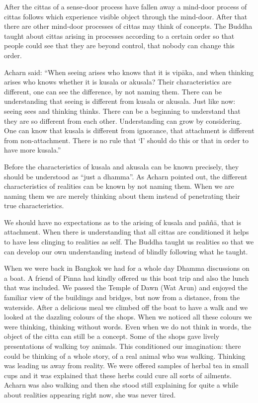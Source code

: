 After the cittas of a sense-door process have fallen away a mind-door
process of cittas follows which experience visible object through the
mind-door. After that there are other mind-door processes of cittas may
think of concepts. The Buddha taught about cittas arising in processes
according to a certain order so that people could see that they are
beyond control, that nobody can change this order.

Acharn said: ``When seeing arises who knows that it is vipāka, and when
thinking arises who knows whether it is kusala or akusala? Their
characteristics are different, one can see the difference, by not naming
them. There can be understanding that seeing is different from kusala or
akusala. Just like now: seeing sees and thinking thinks. There can be a
beginning to understand that they are so different from each other.
Understanding can grow by considering. One can know that kusala is
different from ignorance, that attachment is different from
non-attachment. There is no rule that `I' should do this or that in
order to have more kusala.''

Before the characteristics of kusala and akusala can be known precisely,
they should be understood as ``just a dhamma''. As Acharn pointed out,
the different characteristics of realities can be known by not naming
them. When we are naming them we are merely thinking about them instead
of penetrating their true characteristics.

We should have no expectations as to the arising of kusala and paññā,
that is attachment. When there is understanding that all cittas are
conditioned it helps to have less clinging to realities as self. The
Buddha taught us realities so that we can develop our own understanding
instead of blindly following what he taught.

When we were back in Bangkok we had for a whole day Dhamma discussions
on a boat. A friend of Pinna had kindly offered us this boat trip and
also the lunch that was included. We passed the Temple of Dawn (Wat
Arun) and enjoyed the familiar view of the buildings and bridges, but
now from a distance, from the waterside. After a delicious meal we
climbed off the boat to have a walk and we looked at the dazzling
colours of the shops. When we noticed all these colours we were
thinking, thinking without words. Even when we do not think in words,
the object of the citta can still be a concept. Some of the shops gave
lively presentations of walking toy animals. This conditioned our
imagination: there could be thinking of a whole story, of a real animal
who was walking. Thinking was leading us away from reality. We were
offered samples of herbal tea in small cups and it was explained that
these herbs could cure all sorts of ailments. Acharn was also walking
and then she stood still explaining for quite a while about realities
appearing right now, she was never tired.

